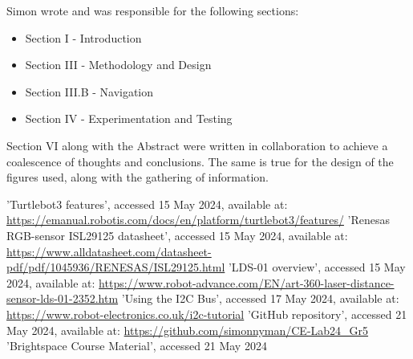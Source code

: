 \documentclass[conference]{IEEEtran}
\begin{document}
Simon wrote and was responsible for the following sections:
\begin{itemize}
    \item Section I - Introduction
    \item Section III - Methodology and Design
    \item Section III.B - Navigation
    \item Section IV - Experimentation and Testing
\end{itemize}

Section VI along with the Abstract were written in collaboration to achieve a coalescence of thoughts and conclusions.
The same is true for the design of the figures used, along with the gathering of information.
\begin{thebibliography}{00}
 'Turtlebot3 features', accessed 15 May 2024, available at: \url{https://emanual.robotis.com/docs/en/platform/turtlebot3/features/}
 'Renesas RGB-sensor ISL29125 datasheet', accessed 15 May 2024, available at: \url{https://www.alldatasheet.com/datasheet-pdf/pdf/1045936/RENESAS/ISL29125.html}
 'LDS-01 overview', accessed 15 May 2024, available at: \url{https://www.robot-advance.com/EN/art-360-laser-distance-sensor-lds-01-2352.htm}
 'Using the I2C Bus', accessed 17 May 2024, available at: \url{https://www.robot-electronics.co.uk/i2c-tutorial}
 'GitHub repository', accessed 21 May 2024, available at: \url{https://github.com/simonnyman/CE-Lab24_Gr5}
 'Brightspace Course Material', accessed 21 May 2024
\end{thebibliography}
\end{document}
